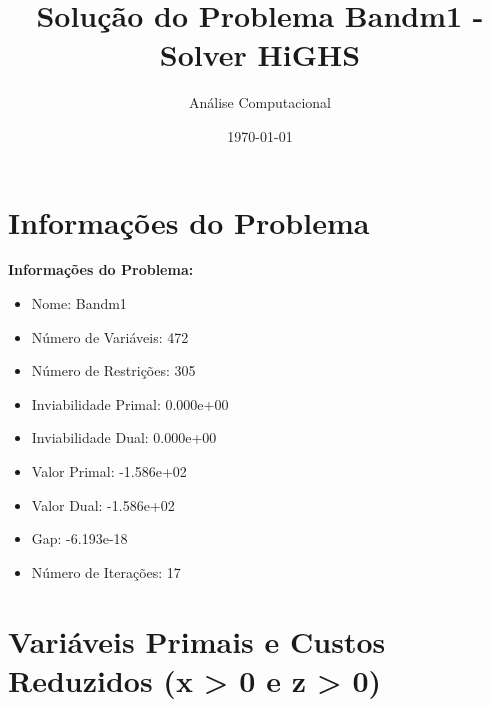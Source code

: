 \documentclass[12pt]{article}
\title{Solução do Problema Bandm1 - Solver HiGHS}
\author{Análise Computacional}
\date{\today}
\begin{document}
\maketitle

\section{Informações do Problema}

\textbf{Informações do Problema:}
\begin{itemize}
\item Nome: Bandm1
\item Número de Variáveis: 472
\item Número de Restrições: 305
\item Inviabilidade Primal: 0.000e+00
\item Inviabilidade Dual: 0.000e+00
\item Valor Primal: -1.586e+02
\item Valor Dual: -1.586e+02
\item Gap: -6.193e-18
\item Número de Iterações: 17
\end{itemize}


\section{Variáveis Primais e Custos Reduzidos (x > 0 e z > 0)}
\end{document}
